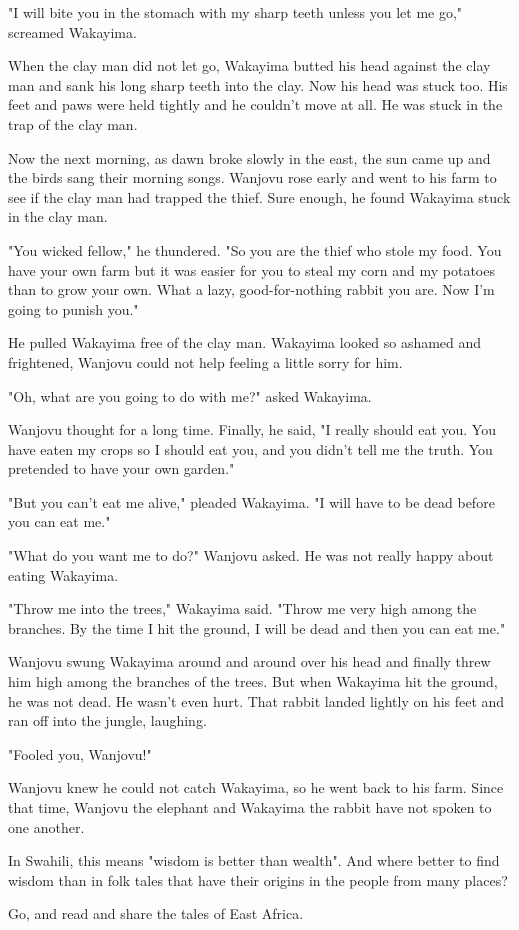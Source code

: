 "I will bite you in the stomach with my sharp teeth unless you let me go," screamed Wakayima.

When the clay man did not let go, Wakayima butted his head against the clay man and sank his long sharp teeth into the clay. Now his head was stuck too. His feet and paws were held tightly and he couldn't move at all. He was stuck in the trap of the clay man.

Now the next morning, as dawn broke slowly in the east, the sun came up and the birds sang their morning songs. Wanjovu rose early and went to his farm to see if the clay man had trapped the thief. Sure enough, he found Wakayima stuck in the clay man.

"You wicked fellow," he thundered. "So you are the thief who stole my food. You have your own farm but it was easier for you to steal my corn and my potatoes than to grow your own. What a lazy, good-for-nothing rabbit you are. Now I'm going to punish you."

He pulled Wakayima free of the clay man. Wakayima looked so ashamed and frightened, Wanjovu could not help feeling a little sorry for him.

"Oh, what are you going to do with me?" asked Wakayima.

Wanjovu thought for a long time. Finally, he said, "I really should eat you. You have eaten my crops so I should eat you, and you didn't tell me the truth. You pretended to have your own garden."

"But you can't eat me alive," pleaded Wakayima. "I will have to be dead before you can eat me."

"What do you want me to do?" Wanjovu asked. He was not really happy about eating Wakayima.

"Throw me into the trees," Wakayima said. "Throw me very high among the branches. By the time I hit the ground, I will be dead and then you can eat me."

Wanjovu swung Wakayima around and around over his head and finally threw him high among the branches of the trees. But when Wakayima hit the ground, he was not dead. He wasn't even hurt. That rabbit landed lightly on his feet and ran off into the jungle, laughing.

"Fooled you, Wanjovu!"

Wanjovu knew he could not catch Wakayima, so he went back to his farm. Since that time, Wanjovu the elephant and Wakayima the rabbit have not spoken to one another.

In Swahili, this means "wisdom is better than wealth". And where better to find wisdom than in folk tales that have their origins in the people from many places?

Go, and read and share the tales of East Africa.

\clearpage
\newpage